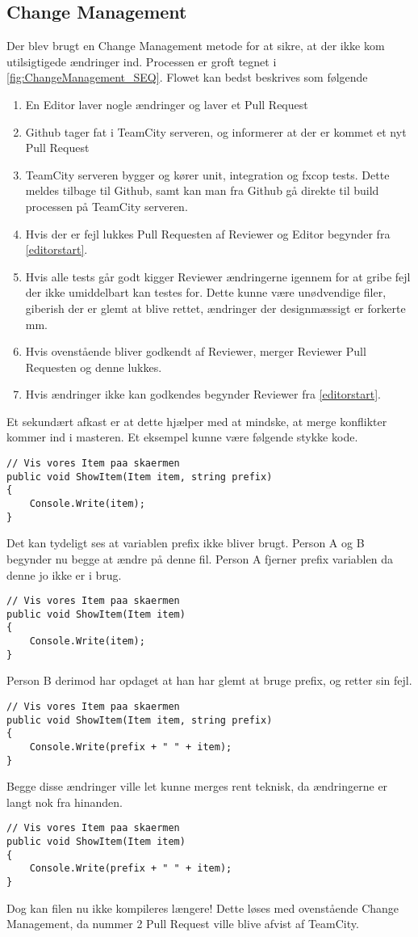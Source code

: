 \subsection{Change Management}
Der blev brugt en Change Management metode for at sikre, at der ikke kom utilsigtigede ændringer ind. Processen er groft tegnet i \ref{fig:ChangeManagement_SEQ}. Flowet kan bedst beskrives som følgende
\begin{enumerate}[label=\arabic{enumi}.,ref=\arabic{enumi}]
  \item \label{editorstart} En Editor laver nogle ændringer og laver et Pull Request
  \item Github tager fat i TeamCity serveren, og informerer at der er kommet et nyt Pull Request
  \item TeamCity serveren bygger og kører unit, integration og fxcop tests. Dette meldes tilbage til Github, samt kan man fra Github gå direkte til build processen på TeamCity serveren.
  \item Hvis der er fejl lukkes Pull Requesten af Reviewer og Editor begynder fra \ref{editorstart}.
  \item Hvis alle tests går godt kigger Reviewer ændringerne igennem for at gribe fejl der ikke umiddelbart kan testes for. Dette kunne være unødvendige filer, giberish der er glemt at blive rettet, ændringer der designmæssigt er forkerte mm.
  \item Hvis ovenstående bliver godkendt af Reviewer, merger Reviewer Pull Requesten og denne lukkes.
  \item Hvis ændringer ikke kan godkendes begynder Reviewer fra \ref{editorstart}.
\end{enumerate}

Et sekundært afkast er at dette hjælper med at mindske, at merge konflikter kommer ind i masteren. Et eksempel kunne være følgende stykke kode.
\begin{lstlisting}
// Vis vores Item paa skaermen
public void ShowItem(Item item, string prefix)
{
    Console.Write(item);
}
\end{lstlisting}
Det kan tydeligt ses at variablen prefix ikke bliver brugt. Person A og B begynder nu begge at ændre på denne fil. Person A fjerner prefix variablen da denne jo ikke er i brug.
\begin{lstlisting}
// Vis vores Item paa skaermen
public void ShowItem(Item item)
{
    Console.Write(item);
}
\end{lstlisting}
Person B derimod har opdaget at han har glemt at bruge prefix, og retter sin fejl.
\begin{lstlisting}
// Vis vores Item paa skaermen
public void ShowItem(Item item, string prefix)
{
    Console.Write(prefix + " " + item);
}
\end{lstlisting}
Begge disse ændringer ville let kunne merges rent teknisk, da ændringerne er langt nok fra hinanden.
\begin{lstlisting}
// Vis vores Item paa skaermen
public void ShowItem(Item item)
{
    Console.Write(prefix + " " + item);
}
\end{lstlisting}
Dog kan filen nu ikke kompileres længere! Dette løses med ovenstående Change Management, da nummer 2 Pull Request ville blive afvist af TeamCity. 
